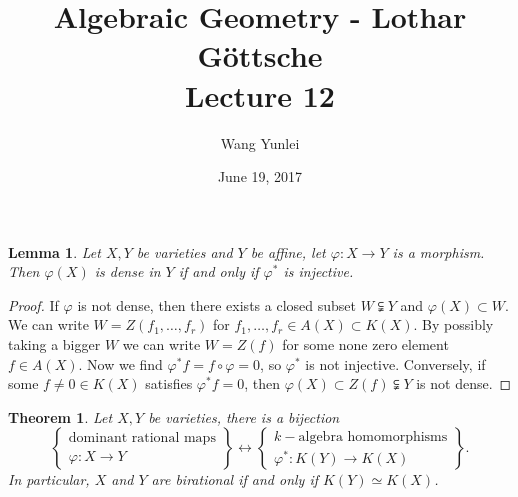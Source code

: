 \documentclass{amsart}
\theoremstyle{plain}
\newtheorem{theorem}{Theorem}
\newtheorem{lemma}{Lemma}
\theoremstyle{definition}
\theoremstyle{remark}
\numberwithin{equation}{section}
\begin{document}
\title[Complete-simple distributive lattices]
{Algebraic Geometry - Lothar G\"{o}ttsche \\
	Lecture 12}
\author{Wang Yunlei}
\date{June 19, 2017}
 
\maketitle

\begin{lemma}
	Let $ X,Y $ be varieties and $ Y $ be affine, let $ \varphi:X\to Y $ is a morphism. Then $ \varphi(X) $ is dense in $ Y $ if and only if $ \varphi^\ast $ is injective.
\end{lemma}\label{21}
\begin{proof}
	If $ \varphi $ is not dense, then there exists a closed subset $ W\subsetneqq Y $ and $ \varphi(X)\subset W $. We can write $ W=Z(f_1,\dots,f_r) $ for $ f_1,\dots,f_r\in A(X)\subset K(X) $. By possibly taking a bigger $ W $ we can write $ W=Z(f) $ for some none zero element $ f\in A(X) $. Now we find $ \varphi^\ast f=f\circ\varphi =0 $, so $ \varphi^\ast $ is not injective. Conversely, if some $ f\neq 0 \in K(X) $ satisfies $ \varphi^\ast f=0 $, then $ \varphi(X)\subset Z(f)\subsetneqq Y $ is not dense.
\end{proof}
\begin{theorem}\label{22}
	Let $ X,Y $ be varieties, there is a bijection
	$$
	\left\lbrace\begin{array}{c}
	\text{dominant rational maps} \\
	\varphi:X \to Y
	\end{array}\right\rbrace\longleftrightarrow\left\lbrace\begin{array}{c}
	k-\text{algebra homomorphisms}\\
	\varphi^\ast:K(Y)\to K(X)
	\end{array}\right\rbrace.
	$$
	In particular, $ X $ and $ Y $ are birational if and only if $ K(Y)\simeq K(X) $.
\end{theorem}
\end{document}
